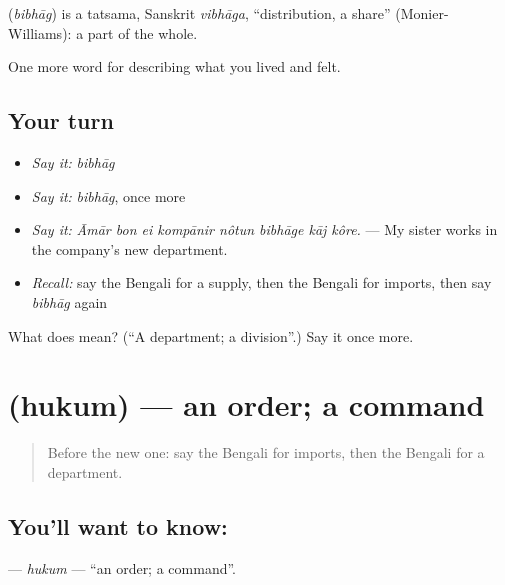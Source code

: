 \begin{cousinweb}
\textbf{} (\emph{bibhāg}) is a tatsama, Sanskrit \emph{vibhāga}, \textquotedblleft{}distribution, a share\textquotedblright{} (Monier-Williams): a part of the whole.
\end{cousinweb}

\begin{grammarlens}[title={What you've built}]
One more word for describing what you lived and felt.
\end{grammarlens}

\subsection*{Your turn}
\begin{itemize}
\raggedright
  \item \emph{Say it:} \emph{bibhāg}
  \item \emph{Say it:} \emph{bibhāg}, once more
  \item \emph{Say it:} \emph{Āmār bon ei kompānir nôtun bibhāge kāj kôre.} — My sister works in the company's new department.
  \item \emph{Recall:} say the Bengali for a supply, then the Bengali for imports, then say \emph{bibhāg} again
\end{itemize}

\begin{tcolorbox}[breakable,colback=teal!4,colframe=teal!35!black,title={Before you move on}]
What does  mean? (\textquotedblleft{}A department; a division\textquotedblright{}.) Say it once more.
\end{tcolorbox}
\section[\texorpdfstring{\bn{হুকুম} (hukum)}{হুকুম (hukum)}]{ (hukum) — an order; a command}

\label{lesson:BN-C500-hukum}



\begin{quote}
Before the new one: say the Bengali for imports, then the Bengali for a department.
\end{quote}

\subsection*{You'll want to know: }
\textbf{} — \emph{hukum} — \textquotedblleft{}an order; a command\textquotedblright{}.

